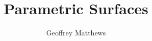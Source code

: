 \documentclass[slidestop,xcolor=pst]{beamer}
\title[Parametric Surfaces]
{
Parametric Surfaces
}
\subtitle{} %
\author[Geoffrey Matthews]
{Geoffrey Matthews}
\institute[WWU/CS]
{
  Department of Computer Science\\
  Western Washington University
}
\begin{document}
\begin{frame}
  \titlepage
\end{frame}

\newcommand{\myref}[1]{\small\item\url{#1}}
\newcommand{\myreff}[1]{\scriptsize\item\url{#1}}


\newcommand{\myframe}[4]{
\pstThreeDLine[arrows=->](#1)(#2)
\pstThreeDLine[arrows=->](#1)(#3)
\pstThreeDLine[arrows=->](#1)(#4)
}

\newcommand{\vtwo}[2]{
\left[\begin{array}{c} #1 \\ #2\end{array}\right]
}
\newcommand{\mtwo}[4]{
\left[\begin{array}{cc} #1 & #2 \\ #3 & #4\end{array}\right]
}
\newcommand{\vthree}[3]{
\left[\begin{array}{c} #1 \\ #2 \\ #3\end{array}\right]
}
\newcommand{\mthree}[9]{
\left[\begin{array}{ccc} #1&#2&#3\\#4&#5&#6\\#7&#8&#9\end{array}\right]
}
\newcommand{\vhomo}[1]{
\left[\begin{array}{c} #1 \\ 0\end{array}\right]
}
\newcommand{\phomo}[1]{
\left[\begin{array}{c} #1 \\ 1\end{array}\right]
}
\newcommand{\whomo}[1]{
\left[\begin{array}{c} #1 \end{array}\right]
}

\newcommand{\mhomo}[3]{
\left[\begin{array}{cccc} #1 \\ #2 \\ #3 \\0&0&0&1\end{array}\right]
}
\newcommand{\wmhomo}[4]{
\left[\begin{array}{cccc} #1 \\ #2 \\ #3 \\ #4\end{array}\right]
}
\end{document}
